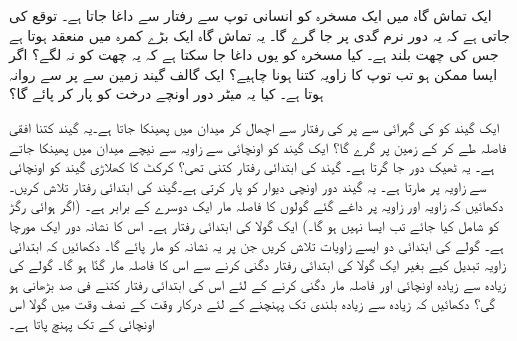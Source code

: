ایک  تماش گاہ   میں  ایک مسخرہ  کو انسانی  توپ سے  رفتار سے داغا جاتا  ہے۔ توقع کی جاتی ہے کہ یہ  دور نرم  گدی  پر جا گرے گا۔ یہ تماش گاہ  ایک بڑے کمرہ میں منعقد ہوتا ہے جس کی چھت  بلند ہے۔  کیا مسخرہ کو یوں داغا جا سکتا ہے کہ یہ چھت کو نہ لگے؟ اگر ایسا ممکن ہو تب توپ کا زاویہ کتنا ہونا چاہیے؟
ایک گالف گیند  زمین سے   پر    سے روانہ ہوتا ہے۔ کیا یہ  میٹر دور  اونچے درخت کو پار کر پائے گا؟

ایک گیند کو  کی گہرائی  سے  پر  کی رفتار سے اچھال  کر میدان میں پھینکا جاتا ہے۔یہ گیند کتنا افقی فاصلہ طے کر کے زمین پر گرے گا؟
ایک گیند کو  اونچائی  سے      زاویہ سے نیچے میدان میں  پھینکا   جاتے ہے۔ یہ  ٹھیک  دور جا گرتا ہے۔ گیند کی ابتدائی رفتار کتنی تھی؟
کرکٹ کا کھلاڑی  گیند کو  اونچائی سے   زاویہ پر  مارتا ہے۔  یہ گیند  دور  اونچی  دیوار کو پار کرتی ہے۔گیند کی ابتدائی رفتار تلاش کریں۔
دکھائیں کہ زاویہ   اور زاویہ  پر داغے گئے گولوں کا فاصلہ مار ایک دوسرے کے برابر ہے۔ (اگر ہوائی رگڑ کو شامل  کیا جائے تب ایسا نہیں ہو گا۔)
ایک گولا  کی ابتدائی رفتار  ہے۔ اس کا نشانہ   دور ایک   مورچا ہے۔ گولے کی ابتدائی دو ایسے  زاویات تلاش کریں جن پر یہ نشانہ کو مار پائے گا۔
دکھائیں کہ ابتدائی زاویہ تبدیل کیے بغیر ایک گولا کی ابتدائی رفتار دگنی کرنے سے اس کا فاصلہ  مار  گنّا ہو گا۔ گولے کی زیادہ سے زیادہ اونچائی اور فاصلہ مار دگنی کرنے کے لئے اس کی ابتدائی رفتار کتنے فی صد بڑھانی ہو گی؟
دکھائیں کہ زیادہ سے زیادہ بلندی تک پہنچنے کے لئے درکار وقت  کے نصف وقت میں گولا اس اونچائی کے  تک پہنچ پاتا ہے۔
